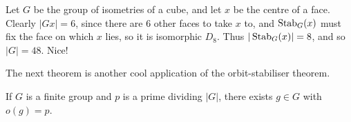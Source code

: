 \documentclass{../template/note}
\begin{document}
    \begin{example*}
        Let \(G\) be the group of isometries of a cube, and let \(x\) be the centre of a face. Clearly \(|Gx| = 6\), since there are 6 other faces to take \(x\) to, and \(\operatorname{Stab}_G(x)\) must fix the face on which \(x\) lies, so it is isomorphic \(D_8\). Thus \(|\operatorname{Stab}_G(x)| = 8\), and so \(|G| = 48\). Nice!
    \end{example*}
    

    The next theorem is another cool application of the orbit-stabiliser theorem.

    \begin{theorem}[Cauchy]
        If \(G\) is a finite group and \(p\) is a prime dividing \(|G|\), there exists \(g \in G\) with \(o(g) = p\).
    \end{theorem}
    
\end{document}
